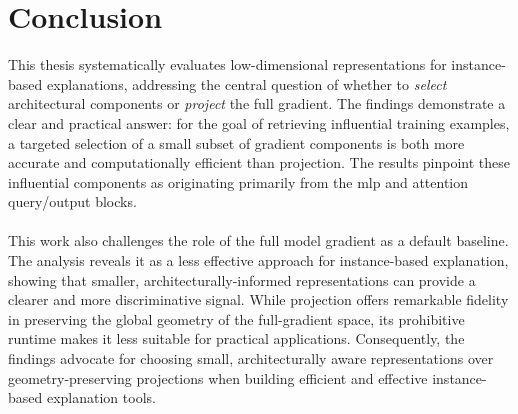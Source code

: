 \chapter{Conclusion}
This thesis systematically evaluates low-dimensional representations for instance-based explanations, addressing the central question of whether to \textit{select} architectural components or \textit{project} the full gradient. The findings demonstrate a clear and practical answer: for the goal of retrieving influential training examples, a targeted selection of a small subset of gradient components is both more accurate and computationally efficient than projection. The results pinpoint these influential components as originating primarily from the \acrshort{mlp} and attention query/output blocks.
\\\\
This work also challenges the role of the full model gradient as a default baseline. The analysis reveals it as a less effective approach for instance-based explanation, showing that smaller, architecturally-informed representations can provide a clearer and more discriminative signal. While projection offers remarkable fidelity in preserving the global geometry of the full-gradient space, its prohibitive runtime makes it less suitable for practical applications. Consequently, the findings advocate for choosing small, architecturally aware representations over geometry-preserving projections when building efficient and effective instance-based explanation tools.